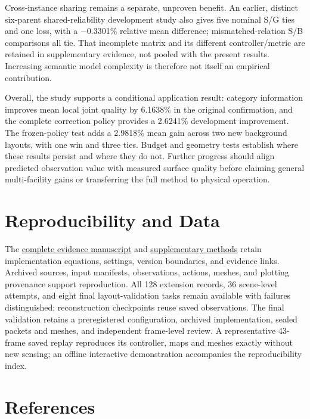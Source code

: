 \documentclass[11pt,a4paper]{article}
\begin{document}
Cross-instance sharing remains a separate, unproven benefit. An earlier, distinct six-parent shared-reliability development study also gives five nominal S/G ties and one loss, with a −0.3301\% relative mean difference; mismatched-relation S/B comparisons all tie. That incomplete matrix and its different controller/metric are retained in supplementary evidence, not pooled with the present results. Increasing semantic model complexity is therefore not itself an empirical contribution.

Overall, the study supports a conditional application result: category information improves mean local joint quality by 6.1638\% in the original confirmation, and the complete correction policy provides a 2.6241\% development improvement. The frozen-policy test adds a 2.9818\% mean gain across two new background layouts, with one win and three ties. Budget and geometry tests establish where these results persist and where they do not. Further progress should align predicted observation value with measured surface quality before claiming general multi-facility gains or transferring the full method to physical operation.

\hypertarget{reproducibility-and-data}{%
\section*{Reproducibility and Data}\label{reproducibility-and-data}}

The \href{/root/NSO/docs/thesis/VIRTUAL_PAPER_EN_20260928.md}{complete evidence manuscript} and \href{/root/NSO/docs/thesis/ARTICLE_SUPPLEMENTARY_METHODS_20260928.pdf}{supplementary methods} retain implementation equations, settings, version boundaries, and evidence links. Archived sources, input manifests, observations, actions, meshes, and plotting provenance support reproduction. All 128 extension records, 36 scene-level attempts, and eight final layout-validation tasks remain available with failures distinguished; reconstruction checkpoints reuse saved observations. The final validation retains a preregistered configuration, archived implementation, sealed packets and meshes, and independent frame-level review. A representative 43-frame saved replay reproduces its controller, maps and meshes exactly without new sensing; an offline interactive demonstration accompanies the reproducibility index.

\hypertarget{references}{%
\section*{References}\label{references}}
\end{document}
